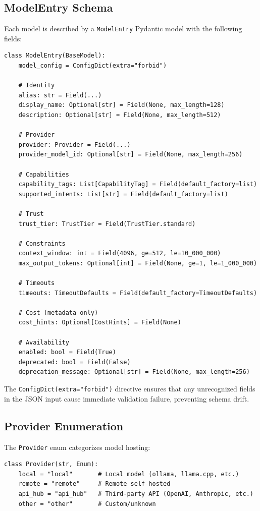 \documentclass[11pt,a4paper]{article}
\theoremstyle{plain}
\theoremstyle{definition}
\begin{document}
\subsection{ModelEntry Schema}

Each model is described by a \texttt{ModelEntry} Pydantic model with the
following fields:

\begin{lstlisting}[style=pythonstyle, caption={ModelEntry schema from \texttt{schema.py}}, label={lst:modelentry}]
class ModelEntry(BaseModel):
    model_config = ConfigDict(extra="forbid")

    # Identity
    alias: str = Field(...)
    display_name: Optional[str] = Field(None, max_length=128)
    description: Optional[str] = Field(None, max_length=512)

    # Provider
    provider: Provider = Field(...)
    provider_model_id: Optional[str] = Field(None, max_length=256)

    # Capabilities
    capability_tags: List[CapabilityTag] = Field(default_factory=list)
    supported_intents: List[str] = Field(default_factory=list)

    # Trust
    trust_tier: TrustTier = Field(TrustTier.standard)

    # Constraints
    context_window: int = Field(4096, ge=512, le=10_000_000)
    max_output_tokens: Optional[int] = Field(None, ge=1, le=1_000_000)

    # Timeouts
    timeouts: TimeoutDefaults = Field(default_factory=TimeoutDefaults)

    # Cost (metadata only)
    cost_hints: Optional[CostHints] = Field(None)

    # Availability
    enabled: bool = Field(True)
    deprecated: bool = Field(False)
    deprecation_message: Optional[str] = Field(None, max_length=256)
\end{lstlisting}

The \texttt{ConfigDict(extra="forbid")} directive ensures that any unrecognized
fields in the JSON input cause immediate validation failure, preventing schema
drift.

\subsection{Provider Enumeration}

The \texttt{Provider} enum categorizes model hosting:

\begin{lstlisting}[style=pythonstyle, caption={Provider enum from \texttt{schema.py}}]
class Provider(str, Enum):
    local = "local"       # Local model (ollama, llama.cpp, etc.)
    remote = "remote"     # Remote self-hosted
    api_hub = "api_hub"   # Third-party API (OpenAI, Anthropic, etc.)
    other = "other"       # Custom/unknown
\end{lstlisting}
\end{document}
